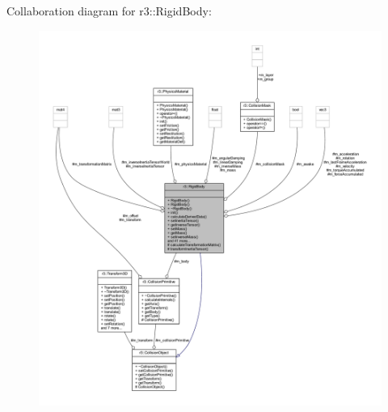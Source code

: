 Collaboration diagram for r3\+:\+:Rigid\+Body\+:\nopagebreak
\begin{figure}[H]
\begin{center}
\leavevmode
\includegraphics[width=350pt]{classr3_1_1_rigid_body__coll__graph}
\end{center}
\end{figure}

